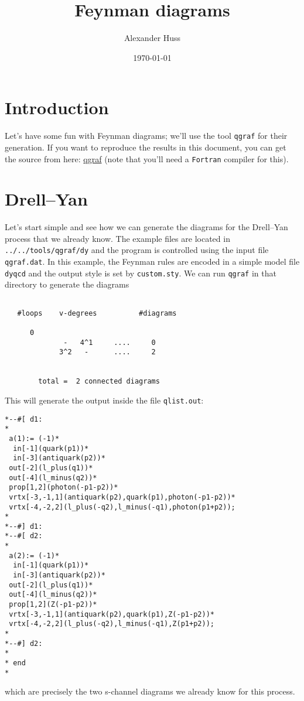 \documentclass[11pt]{article}
\author{Alexander Huss}
\date{\today}
\title{Feynman diagrams}
\begin{document}
\maketitle
\tableofcontents



\section{Introduction}
\label{sec:orgd606787}
Let's have some fun with Feynman diagrams; we'll use the tool \texttt{qgraf} for their generation.
If you want to reproduce the results in this document, you can get the source from here: \href{https://cfif.ist.utl.pt/\~paulo/qgraf.html}{qgraf} (note that you'll need a \texttt{Fortran} compiler for this).

\section{Drell--Yan}
\label{sec:org8b3ee1d}
Let's start simple and see how we can generate the diagrams for the Drell--Yan process that we already know.
The example files are located in \texttt{../../tools/qgraf/dy} and the program is controlled using the input file \texttt{qgraf.dat}.
In this example, the Feynman rules are encoded in a simple model file \texttt{dyqcd} and the output style is set by \texttt{custom.sty}.
We can run \texttt{qgraf} in that directory to generate the diagrams
\begin{verbatim}

   #loops    v-degrees          #diagrams

      0
              -   4^1     ....     0
             3^2   -      ....     2


        total =  2 connected diagrams

\end{verbatim}
This will generate the output inside the file \texttt{qlist.out}:
\begin{verbatim}
*--#[ d1:
*
 a(1):= (-1)*
  in[-1](quark(p1))*
  in[-3](antiquark(p2))*
 out[-2](l_plus(q1))*
 out[-4](l_minus(q2))*
 prop[1,2](photon(-p1-p2))*
 vrtx[-3,-1,1](antiquark(p2),quark(p1),photon(-p1-p2))*
 vrtx[-4,-2,2](l_plus(-q2),l_minus(-q1),photon(p1+p2));
*
*--#] d1:
*--#[ d2:
*
 a(2):= (-1)*
  in[-1](quark(p1))*
  in[-3](antiquark(p2))*
 out[-2](l_plus(q1))*
 out[-4](l_minus(q2))*
 prop[1,2](Z(-p1-p2))*
 vrtx[-3,-1,1](antiquark(p2),quark(p1),Z(-p1-p2))*
 vrtx[-4,-2,2](l_plus(-q2),l_minus(-q1),Z(p1+p2));
*
*--#] d2:
*
* end
*
\end{verbatim}
which are precisely the two s-channel diagrams we already know for this process.
\end{document}
